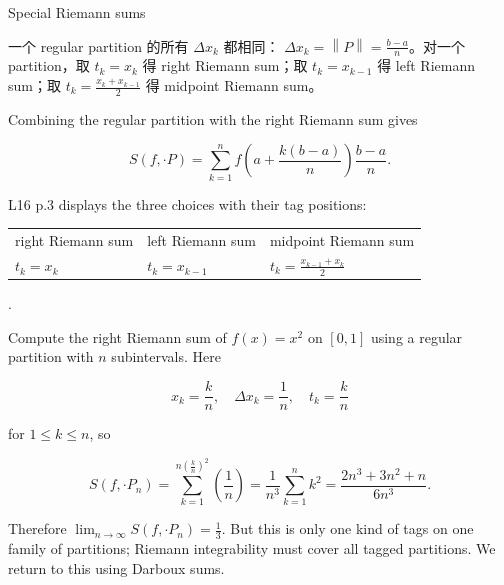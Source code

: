 \begin{definition}{Special Riemann sums}

一个 regular partition 的所有 \(\Delta x_{k}\) 都相同： \(\Delta x_{k} = \left\| P \right\| = \frac{b - a}{n}\)。对一个 partition，取 \(t_{k} = x_{k}\) 得 right Riemann sum；取 \(t_{k} = x_{k - 1}\) 得 left Riemann sum；取 \(t_{k} = \frac{x_{k} + x_{k - 1}}{2}\) 得 midpoint Riemann sum。

Combining the regular partition with the right Riemann sum gives

\[S\left( {f, \cdot P} \right) = \sum\limits_{k = 1}^{n}f\left( {a + \frac{k\left( {b - a} \right)}{n}} \right)\frac{b - a}{n}.\]

L16 p.3 displays the three choices with their tag positions:

{\def\LTcaptype{none} %
\begin{longtable}[]{@{}lll@{}}
\toprule\noalign{}
\endhead
\bottomrule\noalign{}
\endlastfoot
right Riemann sum & left Riemann sum & midpoint Riemann sum \\
\(t_{k} = x_{k}\) & \(t_{k} = x_{k - 1}\) & \(t_{k} = \frac{x_{k - 1} + x_{k}}{2}\) \\
\end{longtable}
}

.

\end{definition}

\begin{example}

Compute the right Riemann sum of \(f(x) = x^{2}\) on \(\left\lbrack {0,1} \right\rbrack\) using a regular partition with \(n\) subintervals. Here

\[x_{k} = \frac{k}{n},\quad\Delta x_{k} = \frac{1}{n},\quad t_{k} = \frac{k}{n}\]

for \(1 \leq k \leq n\), so

\[S\left( {f, \cdot P_{n}} \right) = \sum\limits_{k = 1}^{{n{(\frac{k}{n})}}^{2}}\left( \frac{1}{n} \right) = \frac{1}{n^{3}}\sum\limits_{k = 1}^{n}k^{2} = \frac{2n^{3} + 3n^{2} + n}{6n^{3}}.\]

Therefore \(\lim_{n\rightarrow\infty}S\left( {f, \cdot P_{n}} \right) = \frac{1}{3}\). But this is only one kind of tags on one family of partitions; Riemann integrability must cover all tagged partitions. We return to this using Darboux sums.

\end{example}

